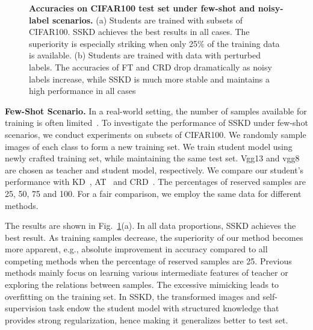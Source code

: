 \documentclass[runningheads]{llncs}
\newcommand{\eg}{e.g.}
\begin{document}
\begin{figure}[ht]
\vspace{-10pt}
\caption{\textbf{Accuracies on CIFAR100 test set under few-shot and noisy-label scenarios.} (a) Students are trained with subsets of CIFAR100. SSKD achieves the best results in all cases. The superiority is especially striking when only 25\% of the training data is available. (b) Students are trained with data with perturbed labels. The accuracies of FT and CRD drop dramatically as noisy labels increase, while SSKD is much more stable and maintains a high performance in all cases}
\label{fig:analysis}
\vspace{-0.1cm}
\end{figure}

\noindent
\textbf{Few-Shot Scenario.}
In a real-world setting, the number of samples available for training is often limited~\cite{liu2019large}. 
To investigate the performance of SSKD under few-shot scenarios, we conduct experiments on subsets of CIFAR100. We randomly sample images of each class to form a new training set. We train student model using newly crafted training set, while maintaining the same test set.
Vgg13 and vgg8 are chosen as teacher and student model, respectively. We compare our student's performance with KD~\cite{KD}, AT~\cite{AT} and CRD~\cite{crd}. The percentages of reserved samples are 25, 50, 75 and 100. For a fair comparison, we employ the same data for different methods.

The results are shown in Fig.~\ref{fig:analysis}(a). In all data proportions, SSKD achieves the best result. As training samples decrease, the superiority of our method becomes more apparent, \eg,  absolute improvement in accuracy compared to all competing methods when the percentage of reserved samples are 25.
Previous methods mainly focus on learning various intermediate features of teacher or exploring the relations between samples. The excessive mimicking leads to overfitting on the training set. In SSKD, the transformed images and self-supervision task endow the student model with structured knowledge that provides strong regularization, hence making it generalizes better to test set.
\end{document}
